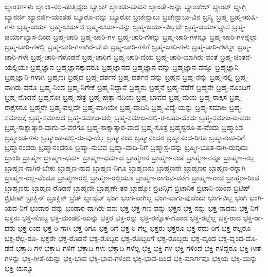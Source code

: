{ಬ್ಯಾಂಕರ್ಗಳು
ಬ್ಯಾಂಕಿ-ನಲ್ಲಿ-ಡುತ್ತಿದ್ದರು
ಬ್ಯಾಂಕ್
ಬ್ಯಾಂಡು-ವಾದನ
ಬ್ಯಾಂಡೇ-ಜನ್ನು
ಬ್ಯಾಂಡೇಜ್
ಬ್ಯಾಂಡ್
ಬ್ಯಾಗ್ಲಿ
ಬ್ಯಾನರ್ಜಿ
ಬ್ಯಾನರ್ಜಿ-ಯಂತಹ
ಬ್ಯೂರೊ-ವನ್ನು
ಬ್ಯೂರೋ
ಬ್ರಜೇನ್ಬಾಬು
ಬ್ರಜೇನ್ಬಾಬು-ವಿನ
ಬ್ರನ್ಕ್ಲಿ
ಬ್ರಹ್ಮ
ಬ್ರಹ್ಮ-ಋಷಿ-ಗಳು
ಬ್ರಹ್ಮ-ಚರ್ಯ
ಬ್ರಹ್ಮ-ಚರ್ಯದ
ಬ್ರಹ್ಮ-ಚರ್ಯ-ವನ್ನು
ಬ್ರಹ್ಮ-ಚರ್ಯ-ವಿಲ್ಲದೇ
ಬ್ರಹ್ಮ-ಚರ್ಯಾಭ್ಯಾಸ
ಬ್ರಹ್ಮ-ಚರ್ಯಾಭ್ಯಾಸ-ದಿಂದ
ಬ್ರಹ್ಮ-ಚಾರಿ
ಬ್ರಹ್ಮ-ಚಾರಿ-ಗಳ
ಬ್ರಹ್ಮ-ಚಾರಿ-ಗಳನ್ನು
ಬ್ರಹ್ಮ-ಚಾರಿ-ಗಳನ್ನೂ
ಬ್ರಹ್ಮ-ಚಾರಿ-ಗಳನ್ನೆಲ್ಲಾ
ಬ್ರಹ್ಮ-ಚಾರಿ-ಗಳಲ್ಲಿ
ಬ್ರಹ್ಮ-ಚಾರಿ-ಗಳಾಗಿರ-ಬೇಕು
ಬ್ರಹ್ಮ-ಚಾರಿ-ಗಳಿಗೆ
ಬ್ರಹ್ಮ-ಚಾರಿ-ಗಳು
ಬ್ರಹ್ಮ-ಚಾರಿ-ಗಳೆಲ್ಲಾ
ಬ್ರಹ್ಮ-ಚಾರಿ-ಗಳೇ
ಬ್ರಹ್ಮ-ಚಾರಿ-ಗಳೊಡನೆ
ಬ್ರಹ್ಮ-ಚಾರಿಗೆ
ಬ್ರಹ್ಮ-ಚಾರಿ-ಣಿಯ
ಬ್ರಹ್ಮ-ಚಾರಿ-ಯಾಗಿರು-ವಂತೆ
ಬ್ರಹ್ಮ-ಚಿಂತನೆ-ಯಲ್ಲಿಯೇ
ಬ್ರಹ್ಮಜ್ಞಾನ
ಬ್ರಹ್ಮಜ್ಞಾನಕ್ಕಾದರೂ
ಬ್ರಹ್ಮಜ್ಞಾನದ
ಬ್ರಹ್ಮಜ್ಞಾನ-ವನ್ನು
ಬ್ರಹ್ಮಜ್ಞಾನ-ವನ್ನೂ
ಬ್ರಹ್ಮಜ್ಞಾನಿ
ಬ್ರಹ್ಮಜ್ಞಾನಿ-ಗಳಾಗಿ
ಬ್ರಹ್ಮಣಃ
ಬ್ರಹ್ಮದ
ಬ್ರಹ್ಮ-ದರ್ಶನ
ಬ್ರಹ್ಮ-ದರ್ಶನ-ವನ್ನು
ಬ್ರಹ್ಮನ
ಬ್ರಹ್ಮ-ನನ್ನು
ಬ್ರಹ್ಮ-ನಲ್ಲಿ
ಬ್ರಹ್ಮ-ನಾಗಿರು-ವನೊ
ಬ್ರಹ್ಮ-ನಿಂದ
ಬ್ರಹ್ಮ-ನಿಗೇಕೆ
ಬ್ರಹ್ಮ-ನಿದ್ದಾನೆ
ಬ್ರಹ್ಮನು
ಬ್ರಹ್ಮನೆ
ಬ್ರಹ್ಮ-ನೆಡೆಗೆ
ಬ್ರಹ್ಮನೇ
ಬ್ರಹ್ಮ-ನೊಂದಿಗೆ
ಬ್ರಹ್ಮ-ನೊಡನೆ
ಬ್ರಹ್ಮನೋ
ಬ್ರಹ್ಮ-ಪುತ್ರ
ಬ್ರಹ್ಮ-ಪುತ್ರಾ-ನದಿಯ
ಬ್ರಹ್ಮ-ಭಾವದ
ಬ್ರಹ್ಮ-ಮಯ
ಬ್ರಹ್ಮ-ರಾಕ್ಷಸ
ಬ್ರಹ್ಮ-ರಾಕ್ಷಸನೂ
ಬ್ರಹ್ಮರೇ
ಬ್ರಹ್ಮ-ವಲ್ಲದೇ
ಬ್ರಹ್ಮ-ವಾಗಿಯೇ
ಬ್ರಹ್ಮ-ವಾದಿನಿ
ಬ್ರಹ್ಮ-ವಿದ್ಯೆ-ಯನ್ನು
ಬ್ರಹ್ಮ-ಸಮಾಜ
ಬ್ರಹ್ಮ-ಸಮಾಜಕ್ಕೆ
ಬ್ರಹ್ಮ-ಸಮಾಜದ
ಬ್ರಹ್ಮ-ಸಮಾಜ-ದಲ್ಲಿ
ಬ್ರಹ್ಮ-ಸಮಾಜ-ದಲ್ಲಿ-ರ-ಬಹು-ದೆಂದು
ಬ್ರಹ್ಮ-ಸಮಾಜ-ದ-ವರು
ಬ್ರಹ್ಮ-ಸಾಕ್ಷಾತ್ಕಾರ-ವಾಗು-ವ-ವರೆಗೂ
ಬ್ರಹ್ಮ-ಸಾಕ್ಷಾತ್ಕಾರ-ವಾದ
ಬ್ರಹ್ಮ-ಸೂತ್ರ
ಬ್ರಹ್ಮಸ್ವರೂ-ಪ-ವೆಂದು
ಬ್ರಹ್ಮಾಂಡ
ಬ್ರಹ್ಮಾಂಡ-ಗಳು
ಬ್ರಹ್ಮಾಂಡ-ದಲ್ಲಿ-ರು-ವು-ದೆಲ್ಲ
ಬ್ರಹ್ಮಾನಂದ
ಬ್ರಹ್ಮಾನಂದರ
ಬ್ರಹ್ಮಾನಂದ-ರಿಗೂ
ಬ್ರಹ್ಮಾನಂದ-ರಿಗೆ
ಬ್ರಹ್ಮಾನಂದರು
ಬ್ರಹ್ಮಾನಂದರೂ
ಬ್ರಹ್ಮಾ-ನುಭವ
ಬ್ರಹ್ಮಾ-ವಾದಿ-ನಿಗೆ
ಬ್ರಹ್ಮಾಸ್ರ-ವನ್ನು
ಬ್ರಹ್ಮೀ-ಭೂತ-ನಾಗಿ-ರುವುದು
ಬ್ರಾಂಡಿ
ಬ್ರಾಹ್ಮಣ
ಬ್ರಾಹ್ಮಣ-ಧರ್ಮ
ಬ್ರಾಹ್ಮಣ-ಧರ್ಮದ
ಬ್ರಾಹ್ಮಣನ
ಬ್ರಾಹ್ಮಣ-ನಂತೆ
ಬ್ರಾಹ್ಮಣ-ನನ್ನೂ
ಬ್ರಾಹ್ಮಣ-ನಲ್ಲ
ಬ್ರಾಹ್ಮಣ-ನಾಗಿರ-ಬೇಕು
ಬ್ರಾಹ್ಮಣ-ನಾದ
ಬ್ರಾಹ್ಮಣ-ನಿಗೂ
ಬ್ರಾಹ್ಮಣನು
ಬ್ರಾಹ್ಮಣನೇ
ಬ್ರಾಹ್ಮಣರ
ಬ್ರಾಹ್ಮಣ-ರನ್ನಾಗಿ
ಬ್ರಾಹ್ಮಣ-ರಲ್ಲ-ವೆಂದೂ
ಬ್ರಾಹ್ಮಣ-ರಲ್ಲಿ
ಬ್ರಾಹ್ಮಣ-ರಲ್ಲಿಯೂ
ಬ್ರಾಹ್ಮಣ-ರಾಗುವ-ವರೆಗೆ
ಬ್ರಾಹ್ಮಣ-ರಾದ
ಬ್ರಾಹ್ಮಣ-ರಿಂದ
ಬ್ರಾಹ್ಮಣರು
ಬ್ರಾಹ್ಮಣ-ರೊಡನೆ
ಬ್ರಾಹ್ಮಣೀ
ಬ್ರಾಹ್ಮಣೇ-ತರ
ಬ್ರಾಹ್ಮೋ
ಬ್ರಿಟನ್ನಿಗೆ
ಬ್ರಿಟಾನಿಕ
ಬ್ರಿಟಾನಿ-ಯಿಂದ
ಬ್ರಿಟಿಷ್
ಬ್ರಿಟೀಷ್
ಬ್ರುಕ್ಲಿನ್
ಬ್ರೂಕ್ಲಿನ್
ಬ್ರೆಡ್
ಬ್ಲಾಡ್ಗೆಟ್
ಭಂಗ
ಭಂಗ-ವಾಗಿಲ್ಲ
ಭಂಗ-ವಾಗು-ವುದೆಂದು
ಭಂಗ-ವಿಲ್ಲ
ಭಂಗಿ
ಭಂಗಿ-ಯವ-ನಿಗೆ
ಭಂಡಾರ-ವನ್ನು
ಭಂಡಾರ-ವಾಗಿರು-ವನು
ಭಕ್ತ
ಭಕ್ತ-ಗಣ-ವನ್ನು
ಭಕ್ತನ
ಭಕ್ತ-ನನ್ನು
ಭಕ್ತ-ನಾದನು
ಭಕ್ತ-ನಿಗೆ
ಭಕ್ತನು
ಭಕ್ತ-ನೊಬ್ಬ
ಭಕ್ತ-ಮಂಡಲಿ-ಯನ್ನು
ಭಕ್ತರ
ಭಕ್ತ-ರನ್ನು
ಭಕ್ತ-ರನ್ನೊಳ-ಗೊಂಡ
ಭಕ್ತ-ರಲ್ಲೆಲ್ಲ
ಭಕ್ತ-ರಾದ
ಭಕ್ತ-ರಾ-ದರು
ಭಕ್ತ-ರಿಂದ
ಭಕ್ತ-ರಿ-ಗಾಗಿ
ಭಕ್ತ-ರಿಗೂ
ಭಕ್ತ-ರಿಗೆ
ಭಕ್ತ-ರಿ-ಗೆಲ್ಲ
ಭಕ್ತರು
ಭಕ್ತರೂ
ಭಕ್ತ-ರೆದು-ರಿಗೆ
ಭಕ್ತ-ರೆಲ್ಲರೂ
ಭಕ್ತ-ರೆಲ್ಲ-ರೂ-
ಭಕ್ತರೇ
ಭಕ್ತ-ರೊಡನೆ
ಭಕ್ತ-ರೊಬ್ಬರ
ಭಕ್ತ-ರೊಬ್ಬರಿಗೆ
ಭಕ್ತ-ರೊಬ್ಬರು
ಭಕ್ತ-ವೃಂದ
ಭಕ್ತ-ವೃಂದ-ದೊ-ಡನೆ
ಭಕ್ತಾದಿ-ಗಳ
ಭಕ್ತಾದಿ-ಗಳಿಗೆ
ಭಕ್ತಾದಿ-ಗಳು
ಭಕ್ತಾದಿ-ಗಳೆಲ್ಲ
ಭಕ್ತಿ
ಭಕ್ತಿ-ಗಳ
ಭಕ್ತಿ-ಗಳಿಂದ
ಭಕ್ತಿ-ಗಳಿದ್ದರೂ
ಭಕ್ತಿ-ಗೀತೆ-ಗಳನ್ನು
ಭಕ್ತಿ-ಗೀತೆ-ಯನ್ನು
ಭಕ್ತಿ-ಭಾವ
ಭಕ್ತಿ-ಭಾವ-ಗಳಿಂದ
ಭಕ್ತಿ-ಭಾವ-ದಿಂದ
ಭಕ್ತಿ-ಮಾರ್ಗವೂ
ಭಕ್ತಿಯ
ಭಕ್ತಿ-ಯನ್ನು
ಭಕ್ತಿ-ಯನ್ನೂ
}
